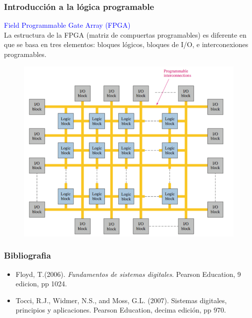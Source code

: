 \documentclass[10.5pt,scale=1.0,t,aspectratio=169,hyperref={pdfpagelabels=false}]{beamer}
\begin{document}
\begin{frame}
	\frametitle{Introducción a la lógica programable}
	\vspace{-0.1in}
\textcolor{blue}{\large Field Programmable Gate Array (FPGA)} \\
La estructura de la FPGA (matriz de compuertas programables) es diferente en que se basa en tres elementos: bloques lógicos, bloques de I/O, e interconexiones programables.
\begin{figure}
	\centering
	\includegraphics[scale=0.5]{FPGA}
\end{figure} 
\end{frame}

\begin{frame}
	\frametitle{Bibliografia}
	\begin{itemize}
		\item Floyd, T.(2006). \textit{Fundamentos de sistemas digitales}. Pearson Education, 9 edicion, pp 1024.
		\item Tocci, R.J., Widmer, N.S., and Moss, G.L. (2007). Sistemas digitales, principios y aplicaciones. Pearson Education, decima edición, pp 970. 
	\end{itemize} 
\end{frame}
%
%
\end{document}
